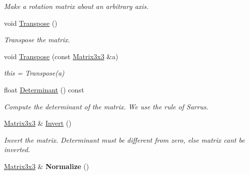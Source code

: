 \begin{DoxyCompactItemize}
\begin{DoxyCompactList}\small\item\em Make a rotation matrix about an arbitrary axis. \end{DoxyCompactList}\item 
void \hyperlink{classMatrix3x3_a749e22af87eed9f1d646a2737792844d}{Transpose} ()\hypertarget{classMatrix3x3_a749e22af87eed9f1d646a2737792844d}{}\label{classMatrix3x3_a749e22af87eed9f1d646a2737792844d}

\begin{DoxyCompactList}\small\item\em Transpose the matrix. \end{DoxyCompactList}\item 
void \hyperlink{classMatrix3x3_a1102e3c3f8d5fa7436b7b448ee587339}{Transpose} (const \hyperlink{classMatrix3x3}{Matrix3x3} \&a)\hypertarget{classMatrix3x3_a1102e3c3f8d5fa7436b7b448ee587339}{}\label{classMatrix3x3_a1102e3c3f8d5fa7436b7b448ee587339}

\begin{DoxyCompactList}\small\item\em this = Transpose(a) \end{DoxyCompactList}\item 
float \hyperlink{classMatrix3x3_a37acc3f90610cd4afc0660be31297bd5}{Determinant} () const \hypertarget{classMatrix3x3_a37acc3f90610cd4afc0660be31297bd5}{}\label{classMatrix3x3_a37acc3f90610cd4afc0660be31297bd5}

\begin{DoxyCompactList}\small\item\em Compute the determinant of the matrix. We use the rule of Sarrus. \end{DoxyCompactList}\item 
\hyperlink{classMatrix3x3}{Matrix3x3} \& \hyperlink{classMatrix3x3_a09c69c6790de1d23159eef6cfaa67ade}{Invert} ()\hypertarget{classMatrix3x3_a09c69c6790de1d23159eef6cfaa67ade}{}\label{classMatrix3x3_a09c69c6790de1d23159eef6cfaa67ade}

\begin{DoxyCompactList}\small\item\em Invert the matrix. Determinant must be different from zero, else matrix can\textquotesingle{}t be inverted. \end{DoxyCompactList}\item 
\hyperlink{classMatrix3x3}{Matrix3x3} \& {\bfseries Normalize} ()\hypertarget{classMatrix3x3_a0f58e158b9b98d162c23eabe33f78acd}{}\label{classMatrix3x3_a0f58e158b9b98d162c23eabe33f78acd}


\end{DoxyCompactItemize}
